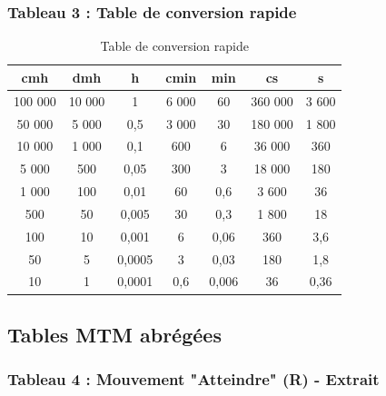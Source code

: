 \documentclass[a4paper,12pt]{article}
\begin{document}
\subsubsection{Tableau 3 : Table de conversion rapide}

\begin{table}[ht]
\centering
\begin{tabular}{|c|c|c|c|c|c|c|}
\hline
\textbf{cmh} & \textbf{dmh} & \textbf{h} & \textbf{cmin} & \textbf{min} & \textbf{cs} & \textbf{s} \\
\hline
100 000 & 10 000 & 1 & 6 000 & 60 & 360 000 & 3 600 \\
50 000 & 5 000 & 0,5 & 3 000 & 30 & 180 000 & 1 800 \\
10 000 & 1 000 & 0,1 & 600 & 6 & 36 000 & 360 \\
5 000 & 500 & 0,05 & 300 & 3 & 18 000 & 180 \\
1 000 & 100 & 0,01 & 60 & 0,6 & 3 600 & 36 \\
500 & 50 & 0,005 & 30 & 0,3 & 1 800 & 18 \\
100 & 10 & 0,001 & 6 & 0,06 & 360 & 3,6 \\
50 & 5 & 0,0005 & 3 & 0,03 & 180 & 1,8 \\
10 & 1 & 0,0001 & 0,6 & 0,006 & 36 & 0,36 \\
\hline
\end{tabular}
\caption{Table de conversion rapide}
\end{table}

\subsection{Tables MTM abrégées}

\subsubsection{Tableau 4 : Mouvement "Atteindre" (R) - Extrait}
\end{document}
